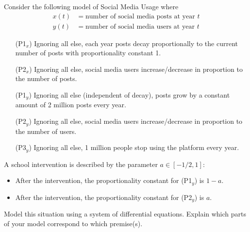 \documentclass{workbook}
\begin{document}
\begin{slide}
	\question
	Consider the following model of Social Media Usage where
	\begin{align*}
		x(t) &= \text{number of social media posts at year $t$}\\
		y(t) &= \text{number of social media users at year $t$}
	\end{align*}
	\begin{itemize}
		\item[(P1$_x$)] Ignoring all else, each year posts decay proportionally to the current number of posts with proportionality constant 1.
		\item[(P2$_x$)] Ignoring all else, social media users increase/decrease in proportion to the number of posts.
		\item[(P1$_y$)] Ignoring all else (independent of decay), posts grow by a constant amount of 2 million posts every year.
		\item[(P2$_y$)] Ignoring all else, social media users increase/decrease in proportion to the number of users.
		\item[(P3$_y$)] Ignoring all else, 1 million people stop using the platform every year.
	\end{itemize}

	\bigskip
	A school intervention is described by the parameter $a\in [-1/2, 1]$:
	\begin{itemize}
		\item After the intervention, the proportionality constant for (P1$_y$) is $1-a$.
		\item After the intervention, the proportionality constant for (P2$_y$) is $a$.
	\end{itemize}

	\begin{parts}
		\item Model this situation using a system of differential equations. Explain
			which parts of your model correspond to which premise(s).
	\end{parts}
\end{slide}
\end{document}
